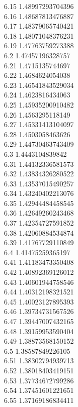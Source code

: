 {6.15	1.48997293704396\\
6.16	1.48687813476887\\
6.17	1.48379065740421\\
6.18	1.48071048376231\\
6.19	1.47763759273388\\
6.2	1.47457196328757\\
6.21	1.4715135744697\\
6.22	1.4684624054038\\
6.23	1.46541843529034\\
6.24	1.4623816434063\\
6.25	1.45935200910482\\
6.26	1.4563295118149\\
6.27	1.45331413104097\\
6.28	1.4503058463626\\
6.29	1.44730463743409\\
6.3	1.4443104839842\\
6.31	1.44132336581573\\
6.32	1.43834326280522\\
6.33	1.43537015490257\\
6.34	1.43240402213076\\
6.35	1.42944484458545\\
6.36	1.42649260243468\\
6.37	1.42354727591852\\
6.38	1.42060884534874\\
6.39	1.41767729110849\\
6.4	1.41475259365197\\
6.41	1.41183473350408\\
6.42	1.40892369126012\\
6.43	1.40601944758546\\
6.44	1.40312198321521\\
6.45	1.40023127895393\\
6.46	1.39734731567526\\
6.47	1.39447007432165\\
6.48	1.39159953590404\\
6.49	1.38873568150152\\
6.5	1.38587849226105\\
6.51	1.38302794939713\\
6.52	1.38018403419151\\
6.53	1.37734672799286\\
6.54	1.37451601221651\\
6.55	1.37169186834411\\
}
